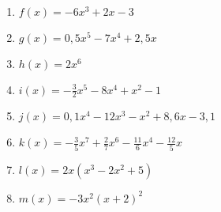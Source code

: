 \begin{Exercise}[title={Gib den Grad, die Koeffizienten, den Leitkoeffizienten sowie das Absolutglied an.}, label=ganzHauptA1]\\
	\begin{minipage}{\textwidth}
		\begin{minipage}{0.49\textwidth}
			\begin{enumerate}[label=\alph*)]
				\item \(f(x)=-6x^3+2x-3\)
				\item \(g(x)=0,5x^5-7x^4+2,5x\)
				\item \(h(x)=2x^6\)
				\item \(i(x)=-\frac{3}{2}x^5-8x^4+x^2-1\)
			\end{enumerate}
		\end{minipage}
		\begin{minipage}{0.49\textwidth}
			\begin{enumerate}[label=\alph*)]
				\setcounter{enumi}{4}
				\item \(j(x)=0,1x^4-12x^3-x^2+8,6x-3,1\)
				\item \(k(x)=-\frac{3}{5}x^7+\frac{2}{7}x^6-\frac{11}{6}x^4-\frac{12}{5}x\)
				\item \(l(x)=2x\left(x^3-2x^2+5\right)\)
				\item \(m(x)=-3x^2\left(x+2\right)^2\)
			\end{enumerate}
		\end{minipage}
	\end{minipage}
\end{Exercise}
\newpage
